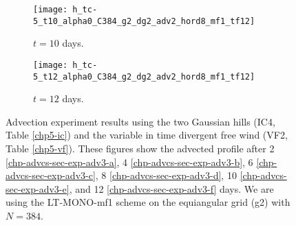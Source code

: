 \begin{figure}[!htb]
	\begin{subfigure}{0.45\textwidth}
		\centering
		\texttt{[image: h\_tc-5\_t10\_alpha0\_C384\_g2\_dg2\_adv2\_hord8\_mf1\_tf12]}
		\caption{$t=10$ days.\label{chp-advcs-sec-exp-adv3-e}}
	\end{subfigure}
	\begin{subfigure}{0.45\textwidth}
		\centering
		\texttt{[image: h\_tc-5\_t12\_alpha0\_C384\_g2\_dg2\_adv2\_hord8\_mf1\_tf12]}
		\caption{$t=12$ days.\label{chp-advcs-sec-exp-adv3-f}}
	\end{subfigure}
	\caption{Advection experiment results using the two Gaussian hills  (IC4, Table \ref{chp5-ic}) and 
		the variable in time divergent free wind (VF2, Table \ref{chp5-vf}).
		These figures show the advected profile after
		2 \eqref{chp-advcs-sec-exp-adv3-a}, 
		4  \eqref{chp-advcs-sec-exp-adv3-b},
		6  \eqref{chp-advcs-sec-exp-adv3-c},
		8  \eqref{chp-advcs-sec-exp-adv3-d},
		10  \eqref{chp-advcs-sec-exp-adv3-e},
		and 12  \eqref{chp-advcs-sec-exp-adv3-f} days.
		We are using the LT-MONO-mf1 scheme on the equiangular grid (g2) with $N=384$.\label{chp-advcs-sec-exp-adv3}}
\end{figure}

